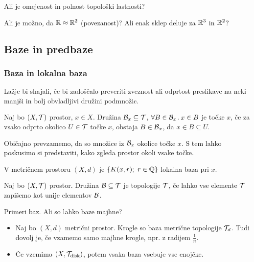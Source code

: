\begin{primer}
    Ali je omejenost in polnost topološki lastnosti?
\end{primer}

\begin{primer}
    Ali je možno, da $\mathbb{R} \approx \mathbb{R}^2$ (povezanost)? Ali enak sklep deluje za $\mathbb{R}^3$ in $\mathbb{R}^2$?
\end{primer}

\newpage
\subsection{Baze in predbaze}
\subsubsection{Baza in lokalna baza}
Lažje bi shajali, če bi zadoščalo preveriti zveznost ali odprtost preslikave na neki manjši in bolj obvladljivi družini podmnožic.

\begin{definicija}
    Naj bo $(X, \mathcal{T})$ prostor, $x \in X$. Družina $\mathcal{B}_x \subseteq \mathcal{T}$, $\forall B \in \mathcal{B}_x \,.\, x \in B$ je  točke $x$, če za vsako odprto okolico $U \in \mathcal{T}$ točke $x$, obstaja $B \in \mathcal{B}_x$, da $x \in B \subseteq U$.
\end{definicija}

\begin{opomba}
    Običajno prevzamemo, da so množice iz $\mathcal{B}_x$ okolice točke $x$. S tem lahko poskusimo si predstaviti, kako zgleda prostor okoli vsake točke.
\end{opomba}

\begin{primer}
    V metričnem prostoru $(X, d)$ je $\left\{K(x,r); \ r \in \mathbb{Q}\right\}$ lokalna baza pri $x$.
\end{primer}

\begin{definicija}
    Naj bo $(X, \mathcal{T})$ prostor. Družina $\mathcal{B} \subseteq \mathcal{T}$ je  topologije $\mathcal{T}$, če lahko vse elemente $\mathcal{T}$ zapišemo kot unije elementov $\mathcal{B}$.
\end{definicija}

\begin{primer}
    Primeri baz. Ali so lahko baze majhne?
    \begin{itemize}
        \item Naj bo $(X, d)$ metrični prostor. Krogle so baza metrične topologije $\mathcal{T}_d$. Tudi dovolj je, če vzamemo samo majhne krogle, npr. z radijem $\frac{1}{n}$.
        \item Če vzemimo $(X, \mathcal{T}_\text{disk})$, potem vsaka baza vsebuje vse enojčke.        
    \end{itemize}
\end{primer}

